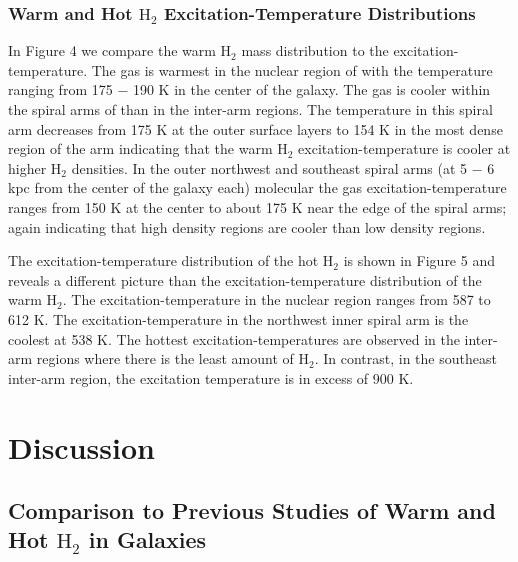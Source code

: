 \documentclass[manuscript]{aastex}
\begin{document}
\subsubsection{Warm and Hot $\mathrm{H_2}$ Excitation-Temperature Distributions}

In Figure 4 we compare the warm $\mathrm{H_2}$ mass distribution to the excitation-temperature.  The gas is warmest in the nuclear region of  with the temperature ranging from 175 $-$ 190 K in the center of the galaxy.  The gas is cooler within the spiral arms of  than in the inter-arm regions.  The temperature in this spiral arm decreases from 175 K at the outer surface layers to 154 K in the most dense region of the arm indicating that the warm $\mathrm{H_2}$ excitation-temperature is cooler at higher $\mathrm{H_2}$ densities.  In the outer northwest and southeast spiral arms (at 5 $-$ 6 kpc from the center of the galaxy each) molecular the gas excitation-temperature ranges from 150 K at the center to about 175 K near the edge of the spiral arms; again indicating that high density regions are cooler than low density regions.  

The excitation-temperature distribution of the hot $\mathrm{H_2}$ is shown in Figure 5 and reveals a different picture than the excitation-temperature distribution of the warm $\mathrm{H_2}$.  The excitation-temperature in the nuclear region ranges from 587 to 612 K.  The excitation-temperature in the northwest inner spiral arm is the coolest at 538 K.  The hottest excitation-temperatures are observed in the inter-arm regions where there is the least amount of $\mathrm{H_2}$.  In contrast, in the southeast inter-arm region, the excitation temperature is in excess of 900 K.

\section{Discussion}

\subsection{Comparison to Previous Studies of Warm and Hot $\mathrm{H_2}$ in Galaxies}
\end{document}
